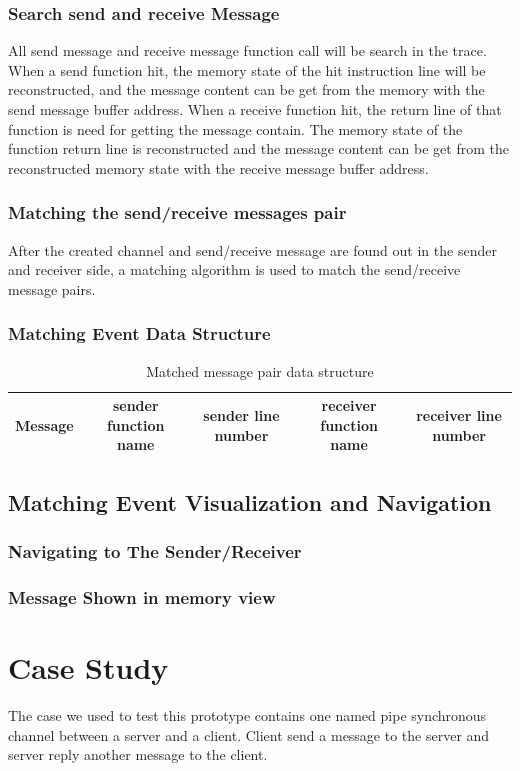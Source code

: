 \documentclass[paper=a4, fontsize=11pt]{scrartcl}
\numberwithin{equation}{section}		%
\numberwithin{figure}{section}			%
\numberwithin{table}{section}				%
\begin{document}
\subsubsection{Search send and receive Message}
All send message and receive message function call will be search in the trace. When a send function hit, the memory state of the hit instruction line will be reconstructed, and the message content can be get from the memory with the send message buffer address. When a receive function hit, the return line of that function is need for getting the message contain. The memory state of the function return line is reconstructed and the message content can be get  from the reconstructed memory state with the receive message buffer address.
\subsubsection{Matching the send/receive messages pair}
After the created channel and send/receive message are found out in the sender and receiver side, a matching algorithm is used to match the send/receive message pairs.
\subsubsection{Matching Event Data Structure}
\begin{table}[h]
 \begin{center}
  \caption{Matched message pair data structure}
\label{table2}
\begin{tabular}{|c|c|c|c|c|}
      \hline
         Message& sender function name & sender line number  & receiver function name & receiver line number \\
       \hline
\end{tabular}
\end{center}
\end{table}
\subsection{Matching Event Visualization and Navigation}
\subsubsection{Navigating to The Sender/Receiver}
\subsubsection{Message Shown in memory view}


\section{Case Study}
The case we used to test this prototype contains one named pipe synchronous channel between a server and a client. Client send a message to the server and server reply another message to the client. 
\end{document}
